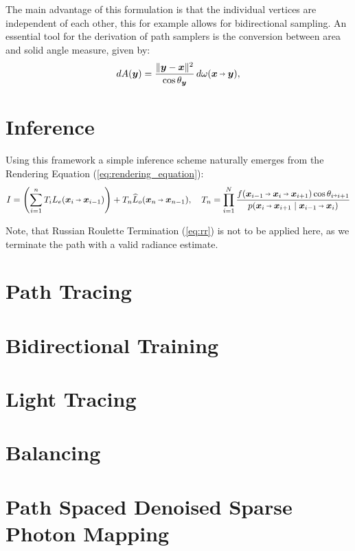 The main advantage of this formulation is that the individual vertices are independent of each other, this for example allows for bidirectional sampling.
An essential tool for the derivation of path samplers is the conversion between area and solid angle measure, given by:
\begin{equation}
\label{eq:area_solid_angle}
\diff A(\vec{y}) = \frac{\|\vec{y} - \vec{x}\|^2}{\cos \theta_{\vec{y}}} \diff \omega(\vec{x}\pto\vec{y}),
\end{equation}

\section{Inference}
Using this framework a simple inference scheme naturally emerges from the Rendering Equation (\autoref{eq:rendering_equation}):
\begin{equation}
\label{eq:inference}
    I
    = \left(\sum_{i=1}^{n} T_i L_e(\pdir{i}{i-1})\right) + T_n \widehat{L}_o(\pdir{n}{n-1}), \quad
    T_n
    = \prod_{i=1}^{N} \frac{f(\ptrip{i-1}{i}{i+1}) \cos \theta_{i \veryshortarrow i+1}}{p(\pdir{i}{i+1} \mid \pdir{i-1}{i})}
\end{equation}

Note, that Russian Roulette Termination (\autoref{eq:rr}) is not to be applied here, as we terminate the path with a valid radiance estimate.

\section{Path Tracing}

\section{Bidirectional Training}

\section{Light Tracing}

\section{Balancing}

\section{Path Spaced Denoised Sparse Photon Mapping}

